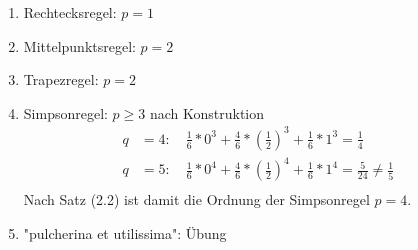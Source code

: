\begin{example}
\begin{description}
  \item
\end{description}

\begin{enumerate}
  \item Rechtecksregel: $p=1$
  \item Mittelpunktsregel: $p=2$
  \item Trapezregel: $p=2$
  \item Simpsonregel: $p \geq 3$ nach Konstruktion \\
  \begin{align*}
  q &= 4: \quad \frac{1}{6} * 0^3 + \frac{4}{6} * \left(\frac{1}{2}\right)^3 + \frac{1}{6}*1^3 = \frac{1}{4} &\\
  q &= 5: \quad \frac{1}{6} * 0^4 + \frac{4}{6} * \left(\frac{1}{2}\right)^4 + \frac{1}{6}*1^4 = \frac{5}{24} \neq \frac{1}{5}&\\
  \end{align*}
  Nach Satz (2.2) ist damit die Ordnung der Simpsonregel $p=4$.
  \item "pulcherina et utilissima": Übung
\end{enumerate}
\end{example}

\begin{comment}
Zu vergebenen paarweise verschiedenen Knoten $c_1, ..., c_s$ lässt sich mit Satz (2.2) für $p=s$ ein lineares Gleichungssystem für die Gewichte $b_1, ..., b_s$ aufstellen.\\

$$
\underbrace{\left[ \begin{array}{rrrr}
1 & 1 & ... & 1 \\
c_1 & c_2 & ... & c_s \\
... & ... & ... & ... \\
c_1^{s-1} & c_2^{s-1} & ... & c_s^{s-1} \\
\end{array}\right]}_{= V}
*
\left[ \begin{array}{r}
b_1 \\
b_2 \\
... \\
b_s \\
\end{array}\right] 
= 
\left[ \begin{array}{r}
1 \\
1/2 \\
... \\
1/s \\
\end{array}\right] 
$$
Falls die Vandermonde-Matrix V invertierbar ist, so lassen sich die Gewichte $b_1, ..., b_s$ bestimmen, sodass die QF $(b_i, c_i)_{i = 1}^{s}$ mindestens Ordnung $s$ hat.
\end{comment}

